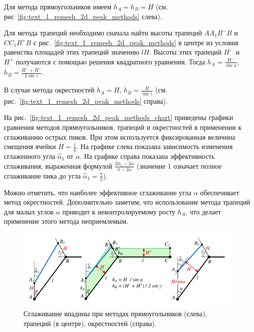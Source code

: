 \documentclass[
11pt,%
tightenlines,%
twoside,%
onecolumn,%
nofloats,%
nobibnotes,%
nofootinbib,%
superscriptaddress,%
noshowpacs,%
centertags]%
{revtex4}
\begin{document}
Для метода прямоугольников имеем $h_A = h_B = H$ (см. рис~\ref{fig:text_1_remesh_2d_peak_methods} слева).

Для метода трапеций необходимо сначала найти высоты трапеций $AA_1B^{-}B$ и $CC_1B^{+}B$ с рис.~\ref{fig:text_1_remesh_2d_peak_methods} в центре из условия равенства площадей этих трапеций значению $lH$.
Высоты этих трапеций $H^{-}$ и $H^{+}$ получаются с помощью решения квадратного уравнения.
Тогда $h_A = \frac{H^{-}}{\sin \alpha}$, $h_B = \frac{H^{-} + H^{+}}{2 \sin \gamma}$.

В случае метода окрестностей $h_A = H$,  $h_B = \frac{H}{\sin \gamma}$ (см. рис.~\ref{fig:text_1_remesh_2d_peak_methods} справа).

На рис.~\ref{fig:text_1_remesh_2d_peak_methods_chart} приведены графики сравнения методов прямоугольников, трапеций и окрестностей в применении к сглаживанию острых пиков.
При этом используется фиксированная величина смещения ячейки $H = \frac{l}{4}$.
На графике слева показана зависимость изменения сглаженного угла $\hat{\alpha}_1$ от $\alpha$.
На графике справа показана эффективность сглаживания, выраженная формулой $\frac{2 \hat{\alpha}_1 - 2 \alpha}{\pi - 2 \alpha}$ (значение 1 означает полное сглаживание пика до угла $\hat{\alpha}_1 = \frac{\pi}{2}$).

Можно отметить, что наиболее эффективное сглаживание угла $\alpha$ обеспечивает метод окрестностей.
Дополнительно заметим, что использование метода трапеций для малых углов $\alpha$ приводит к неконтролируемому росту $h_A$, что делает применение этого метода неприемлемым.

\begin{figure}[ht]
\setcaptionmargin{5mm}
\onelinecaptionsfalse %
\includegraphics[width=1.0\textwidth]{./pics/cavern-methods.pdf}
\caption{Сглаживание впадины при методах прямоугольников (слева), трапеций (в центре), окрестностей (справа).}
\label{fig:text_1_remesh_2d_cavern_methods}
\end{figure}
\end{document}
